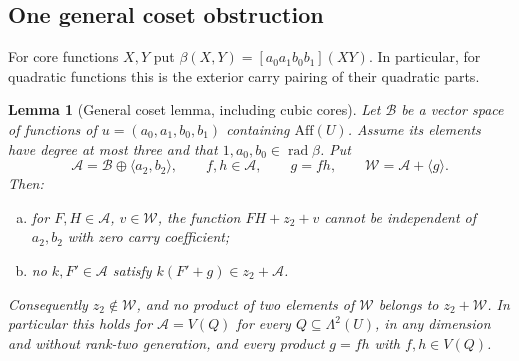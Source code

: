 \documentclass[11pt,a4paper]{article}
\theoremstyle{plain}
\newtheorem{lemma}[theorem]{Lemma}
\theoremstyle{remark}
\newcommand{\Aff}{\mathrm{Aff}}
\newcommand{\rad}{\operatorname{rad}}
\begin{document}
\subsection{One general coset obstruction}
For core functions $X,Y$ put $\beta(X,Y)=[a_0a_1b_0b_1](XY)$. In particular, for quadratic functions this is the exterior carry pairing of their quadratic parts.

\begin{lemma}[General coset lemma, including cubic cores]\label{toolkit:coset}
Let $\mathcal B$ be a vector space of functions of $u=(a_0,a_1,b_0,b_1)$ containing $\Aff(U)$. Assume its elements have degree at most three and that $1,a_0,b_0\in\rad\beta$. Put
\[
\mathcal A=\mathcal B\oplus\langle a_2,b_2\rangle,\qquad f,h\in\mathcal A,\qquad g=fh,\qquad\mathcal W=\mathcal A+\langle g\rangle.
\]
Then:
\begin{enumerate}[(a)]
\item for $F,H\in\mathcal A$, $v\in\mathcal W$, the function $FH+z_2+v$ cannot be independent of $a_2,b_2$ with zero carry coefficient;
\item no $k,F'\in\mathcal A$ satisfy $k(F'+g)\in z_2+\mathcal A$.
\end{enumerate}
Consequently $z_2\notin\mathcal W$, and no product of two elements of $\mathcal W$ belongs to $z_2+\mathcal W$.
In particular this holds for $\mathcal A=V(Q)$ for every $Q\subseteq\Lambda^2(U)$, in any dimension and without rank-two generation, and every product $g=fh$ with $f,h\in V(Q)$.
\end{lemma}
\end{document}
